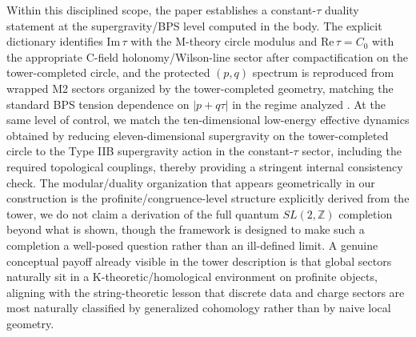 \documentclass[11pt]{article}
\theoremstyle{remark}
\newcommand{\Z}{\mathbb{Z}}
\begin{document}
Within this disciplined scope, the paper establishes a constant-\(\tau\) duality statement at the supergravity/BPS level computed in the body. The explicit dictionary identifies \(\mathrm{Im}\,\tau\) with the M-theory circle modulus and \(\mathrm{Re}\,\tau=C_{0}\) with the appropriate C-field holonomy/Wilson-line sector after compactification on the tower-completed circle, and the protected \((p,q)\) spectrum is reproduced from wrapped M2 sectors organized by the tower-completed geometry, matching the standard BPS tension dependence on \(|p+q\tau|\) in the regime analyzed \cite{Sen1994, Schwarz1995, Bergshoeff1995}. At the same level of control, we match the ten-dimensional low-energy effective dynamics obtained by reducing eleven-dimensional supergravity on the tower-completed circle to the Type IIB supergravity action in the constant-\(\tau\) sector, including the required topological couplings, thereby providing a stringent internal consistency check. The modular/duality organization that appears geometrically in our construction is the profinite/congruence-level structure explicitly derived from the tower, we do not claim a derivation of the full quantum \(SL(2,\Z)\) completion beyond what is shown, though the framework is designed to make such a completion a well-posed question rather than an ill-defined limit. A genuine conceptual payoff already visible in the tower description is that global sectors naturally sit in a K-theoretic/homological environment on profinite objects, aligning with the string-theoretic lesson that discrete data and charge sectors are most naturally classified by generalized cohomology rather than by naive local geometry.
\end{document}
